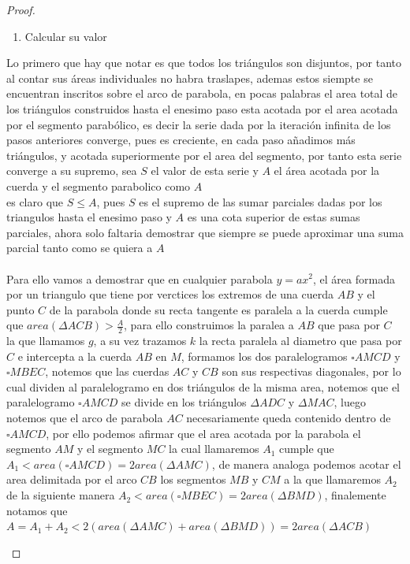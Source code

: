 \documentclass[11pt,letterpaper]{article}
\begin{document}
\begin{proof}
\begin{enumerate}
\begin{enumerate}
    \item Calcular su valor
\end{enumerate}
Lo primero que hay que notar es que todos los tri\'angulos son disjuntos, por tanto al contar sus \'areas individuales no habra traslapes, ademas estos siempte se encuentran inscritos sobre el arco de parabola, en pocas palabras el area total de los tri\'angulos construidos hasta el enesimo paso esta acotada por el area acotada por el segmento parab\'olico, es decir
la serie dada por la iteraci\'on infinita de los pasos anteriores converge, pues es creciente, en cada paso añadimos m\'as tri\'angulos, y acotada superiormente por el area del segmento, por tanto esta serie converge a su supremo, sea $S$ el valor de esta serie y $A$ el \'area acotada por la cuerda y el segmento parabolico como $A$\,\\
es claro que $S\leq A$, pues $S$ es el supremo de las sumar parciales dadas por los triangulos hasta el enesimo paso y $A$ es una cota superior de estas sumas parciales, ahora solo faltaria demostrar que siempre  se puede aproximar una suma parcial tanto como se quiera a $A$\,\\
\,\\
Para ello vamos a demostrar que en cualquier parabola $y=ax^2$, el \'area formada por un triangulo que tiene por verctices los extremos de una cuerda $AB$ y el punto $C$ de la parabola donde su recta tangente es paralela a la cuerda cumple que $area(\Delta ACB )>\frac{A}{2}$, para ello construimos la paralea a $AB$ que pasa por $C$ la que llamamos $g$, a su vez trazamos $k$ la recta paralela al diametro que pasa por $C$ e intercepta a la cuerda $AB$ en $M$, formamos los dos paralelogramos $\square AMCD$ y $\square MBEC$, notemos que las cuerdas $AC$ y $CB$ son sus respectivas diagonales, por lo cual dividen al paralelogramo en dos tri\'angulos de la misma area, notemos que el paralelogramo $\square AMCD$ se divide en los tri\'angulos $\Delta ADC$ y $\Delta MAC$, luego notemos que el arco de parabola $AC$ necesariamente queda contenido dentro de  
$\square AMCD$, por ello podemos afirmar que el area acotada por la parabola el segmento $AM$ y el segmento $MC$ la cual llamaremos $A_1$ cumple que $A_1<area(\square AMCD)=2area(\Delta AMC)$, de manera analoga podemos acotar el area delimitada por el arco $CB$ los segmentos $MB$ y $CM$ a la que llamaremos $A_2$ de la siguiente manera $A_2<area(\square MBEC)=2area(\Delta BMD)$, finalemente notamos que $A=A_1+A_2<2(area(\Delta AMC)+area(\Delta BMD))=2area(\Delta ACB)$
\begin{figure}[h!]

\end{figure}
\end{enumerate}
\end{proof}
\end{document}
